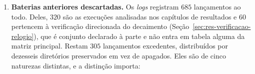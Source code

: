 \begin{enumerate}
    \item \textbf{Baterias anteriores descartadas.} Os \textit{logs} registram $685$
    lançamentos ao todo. Deles, $320$ são as execuções analisadas nos capítulos de
    resultados e $60$ pertencem à verificação direcionada do decaimento
    (Seção~\ref{sec:res-verificacao-relogio}), que é conjunto declarado à parte e não
    entra em tabela alguma da matriz principal. Restam $305$ lançamentos excedentes,
    distribuídos por dezesseis diretórios preservados em vez de apagados. Eles são de
    cinco naturezas distintas, e a distinção importa:


\end{enumerate}
